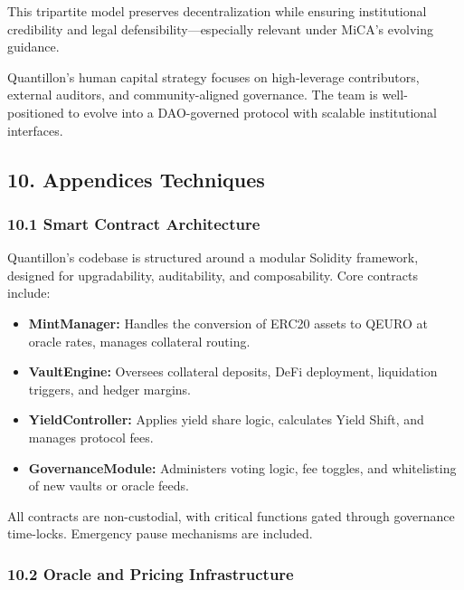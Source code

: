 This tripartite model preserves decentralization while ensuring
institutional credibility and legal defensibility---especially relevant
under MiCA's evolving guidance.

Quantillon's human capital strategy focuses on high-leverage
contributors, external auditors, and community-aligned governance. The
team is well-positioned to evolve into a DAO-governed protocol with
scalable institutional interfaces.

\hypertarget{appendices-techniques}{%
\subsection{10. Appendices Techniques}\label{appendices-techniques}}

\hypertarget{smart-contract-architecture}{%
\subsubsection{10.1 Smart Contract
Architecture}\label{smart-contract-architecture}}

Quantillon's codebase is structured around a modular Solidity framework,
designed for upgradability, auditability, and composability. Core
contracts include:

\begin{itemize}
\item
  \textbf{MintManager:} Handles the conversion of ERC20 assets to QEURO
  at oracle rates, manages collateral routing.
\item
  \textbf{VaultEngine:} Oversees collateral deposits, DeFi deployment,
  liquidation triggers, and hedger margins.
\item
  \textbf{YieldController:} Applies yield share logic, calculates Yield
  Shift, and manages protocol fees.
\item
  \textbf{GovernanceModule:} Administers voting logic, fee toggles, and
  whitelisting of new vaults or oracle feeds.
\end{itemize}

All contracts are non-custodial, with critical functions gated through
governance time-locks. Emergency pause mechanisms are included.

\hypertarget{oracle-and-pricing-infrastructure}{%
\subsubsection{10.2 Oracle and Pricing
Infrastructure}\label{oracle-and-pricing-infrastructure}}

